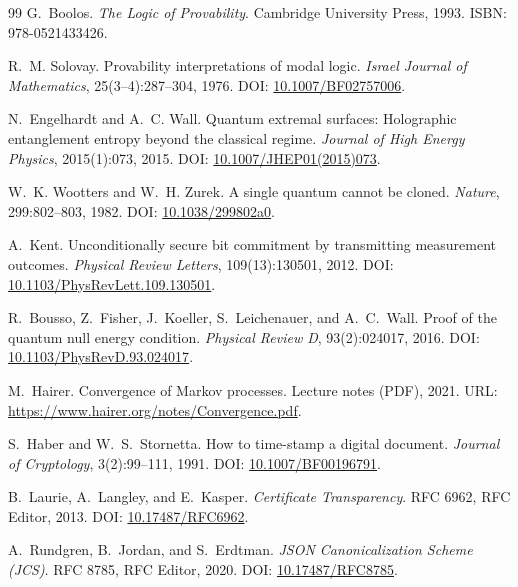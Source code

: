 \documentclass[11pt,a4paper]{article}
\theoremstyle{definition}
\theoremstyle{remark}
\begin{document}
\begin{thebibliography}{99}
G.~Boolos.
\newblock \emph{The Logic of Provability}.
\newblock Cambridge University Press, 1993.
\newblock ISBN: 978-0521433426.

R.~M. Solovay.
\newblock Provability interpretations of modal logic.
\newblock \emph{Israel Journal of Mathematics}, 25(3--4):287--304, 1976.
\newblock DOI: \href{https://doi.org/10.1007/BF02757006}{10.1007/BF02757006}.

N.~Engelhardt and A.~C. Wall.
\newblock Quantum extremal surfaces: Holographic entanglement entropy beyond the classical regime.
\newblock \emph{Journal of High Energy Physics}, 2015(1):073, 2015.
\newblock DOI: \href{https://doi.org/10.1007/JHEP01(2015)073}{10.1007/JHEP01(2015)073}.

W.~K. Wootters and W.~H. Zurek.
\newblock A single quantum cannot be cloned.
\newblock \emph{Nature}, 299:802--803, 1982.
\newblock DOI: \href{https://doi.org/10.1038/299802a0}{10.1038/299802a0}.

A.~Kent.
\newblock Unconditionally secure bit commitment by transmitting measurement outcomes.
\newblock \emph{Physical Review Letters}, 109(13):130501, 2012.
\newblock DOI: \href{https://doi.org/10.1103/PhysRevLett.109.130501}{10.1103/PhysRevLett.109.130501}.

R.~Bousso, Z.~Fisher, J.~Koeller, S.~Leichenauer, and A.~C.~Wall.
\newblock Proof of the quantum null energy condition.
\newblock \emph{Physical Review D}, 93(2):024017, 2016.
\newblock DOI: \href{https://doi.org/10.1103/PhysRevD.93.024017}{10.1103/PhysRevD.93.024017}.

M.~Hairer.
\newblock Convergence of Markov processes.
\newblock Lecture notes (PDF), 2021.
\newblock URL: \url{https://www.hairer.org/notes/Convergence.pdf}.

S.~Haber and W.~S.~Stornetta.
\newblock How to time-stamp a digital document.
\newblock \emph{Journal of Cryptology}, 3(2):99--111, 1991.
\newblock DOI: \href{https://doi.org/10.1007/BF00196791}{10.1007/BF00196791}.

B.~Laurie, A.~Langley, and E.~Kasper.
\newblock \emph{Certificate Transparency}.
\newblock RFC 6962, RFC Editor, 2013.
\newblock DOI: \href{https://doi.org/10.17487/RFC6962}{10.17487/RFC6962}.

A.~Rundgren, B.~Jordan, and S.~Erdtman.
\newblock \emph{JSON Canonicalization Scheme (JCS)}.
\newblock RFC 8785, RFC Editor, 2020.
\newblock DOI: \href{https://doi.org/10.17487/RFC8785}{10.17487/RFC8785}.


\end{thebibliography}
\end{document}
